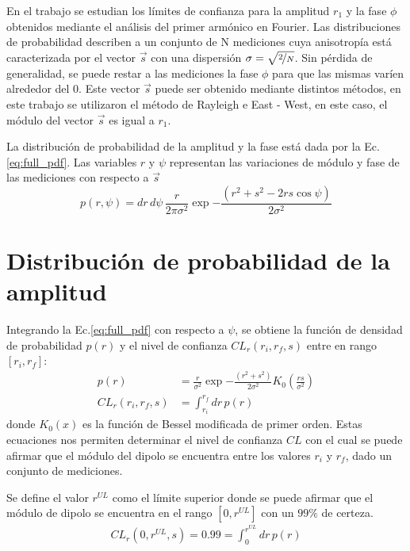 
En el trabajo \cite{linsley1975fluctuation} se estudian los límites de confianza para la amplitud $r_1$ y la fase $\phi$ obtenidos mediante el análisis del primer armónico en Fourier. Las distribuciones de probabilidad describen a un conjunto de N mediciones cuya anisotropía está caracterizada por el vector $\vec{s}$ con una dispersión $\sigma = \sqrt{\nicefrac{2}{N}}$.  Sin pérdida de generalidad, se puede restar a las mediciones la fase $\phi$ para que las mismas varíen alrededor del 0. Este vector $\vec{s}$ puede ser obtenido mediante distintos métodos, en este trabajo se  utilizaron el método de Rayleigh e East - West, en este caso, el módulo del vector $\vec{s}$  es igual a $r_1$.

La distribución de probabilidad de la amplitud y la fase está dada por la Ec.\ref{eq:full_pdf}. Las variables $r$ y $\psi$ representan las variaciones de módulo y fase de las mediciones con respecto a $\vec{s}$
\begin{equation}
    p(r,\psi) =dr\,d\psi\,\frac{r}{2\pi\sigma^2}\exp{ -\frac{(r^2+s^2 - 2rs\cos\psi)}{2\sigma^2} } \label{eq:full_pdf}
\end{equation}  

\section{Distribución de probabilidad de la amplitud}

Integrando la Ec.\ref{eq:full_pdf} con respecto a $\psi$, se obtiene la función de densidad de probabilidad $p(r)$ y el nivel de confianza $ CL_r(r_i,r_f,s)$ entre en rango $[r_i,r_f]$:
\begin{align}
    p(r) &=\frac{r}{\sigma^2}\exp{ -\frac{(r^2+s^2)}{2\sigma^2} }K_0(\frac{rs}{\sigma^2})    \label{ec:pdf}\\
    CL_r(r_i,r_f,s) &= \int_{r_i}^{r_f} dr \, p(r)
    \label{ec:integral}
\end{align}
donde $K_0(x)$ es la función de Bessel modificada de primer orden.
Estas ecuaciones nos permiten determinar el nivel de confianza $CL$ con el cual se puede afirmar que el módulo del dipolo se encuentra entre los valores $r_i$ y $r_f$, dado un conjunto de mediciones.

Se define el valor $r^{UL}$ como el límite superior donde se puede afirmar que el módulo de dipolo se encuentra en el rango $[0, r^{UL}]$ con un $99\%$ de certeza.
\begin{align}
    CL_r(0,r^{UL},s) = 0.99 = \int_{0}^{r^{UL}} dr \, p(r)
    \label{ec:r_upper_limit}
\end{align} 

